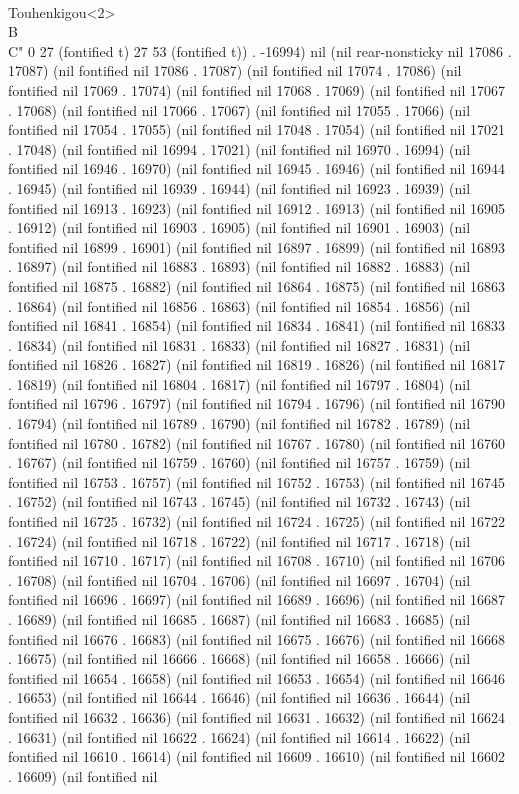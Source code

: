 		     \\Touhenkigou<2>\\B\\C" 0 27 (fontified t) 27 53 (fontified t)) . -16994) nil (nil rear-nonsticky nil 17086 . 17087) (nil fontified nil 17086 . 17087) (nil fontified nil 17074 . 17086) (nil fontified nil 17069 . 17074) (nil fontified nil 17068 . 17069) (nil fontified nil 17067 . 17068) (nil fontified nil 17066 . 17067) (nil fontified nil 17055 . 17066) (nil fontified nil 17054 . 17055) (nil fontified nil 17048 . 17054) (nil fontified nil 17021 . 17048) (nil fontified nil 16994 . 17021) (nil fontified nil 16970 . 16994) (nil fontified nil 16946 . 16970) (nil fontified nil 16945 . 16946) (nil fontified nil 16944 . 16945) (nil fontified nil 16939 . 16944) (nil fontified nil 16923 . 16939) (nil fontified nil 16913 . 16923) (nil fontified nil 16912 . 16913) (nil fontified nil 16905 . 16912) (nil fontified nil 16903 . 16905) (nil fontified nil 16901 . 16903) (nil fontified nil 16899 . 16901) (nil fontified nil 16897 . 16899) (nil fontified nil 16893 . 16897) (nil fontified nil 16883 . 16893) (nil fontified nil 16882 . 16883) (nil fontified nil 16875 . 16882) (nil fontified nil 16864 . 16875) (nil fontified nil 16863 . 16864) (nil fontified nil 16856 . 16863) (nil fontified nil 16854 . 16856) (nil fontified nil 16841 . 16854) (nil fontified nil 16834 . 16841) (nil fontified nil 16833 . 16834) (nil fontified nil 16831 . 16833) (nil fontified nil 16827 . 16831) (nil fontified nil 16826 . 16827) (nil fontified nil 16819 . 16826) (nil fontified nil 16817 . 16819) (nil fontified nil 16804 . 16817) (nil fontified nil 16797 . 16804) (nil fontified nil 16796 . 16797) (nil fontified nil 16794 . 16796) (nil fontified nil 16790 . 16794) (nil fontified nil 16789 . 16790) (nil fontified nil 16782 . 16789) (nil fontified nil 16780 . 16782) (nil fontified nil 16767 . 16780) (nil fontified nil 16760 . 16767) (nil fontified nil 16759 . 16760) (nil fontified nil 16757 . 16759) (nil fontified nil 16753 . 16757) (nil fontified nil 16752 . 16753) (nil fontified nil 16745 . 16752) (nil fontified nil 16743 . 16745) (nil fontified nil 16732 . 16743) (nil fontified nil 16725 . 16732) (nil fontified nil 16724 . 16725) (nil fontified nil 16722 . 16724) (nil fontified nil 16718 . 16722) (nil fontified nil 16717 . 16718) (nil fontified nil 16710 . 16717) (nil fontified nil 16708 . 16710) (nil fontified nil 16706 . 16708) (nil fontified nil 16704 . 16706) (nil fontified nil 16697 . 16704) (nil fontified nil 16696 . 16697) (nil fontified nil 16689 . 16696) (nil fontified nil 16687 . 16689) (nil fontified nil 16685 . 16687) (nil fontified nil 16683 . 16685) (nil fontified nil 16676 . 16683) (nil fontified nil 16675 . 16676) (nil fontified nil 16668 . 16675) (nil fontified nil 16666 . 16668) (nil fontified nil 16658 . 16666) (nil fontified nil 16654 . 16658) (nil fontified nil 16653 . 16654) (nil fontified nil 16646 . 16653) (nil fontified nil 16644 . 16646) (nil fontified nil 16636 . 16644) (nil fontified nil 16632 . 16636) (nil fontified nil 16631 . 16632) (nil fontified nil 16624 . 16631) (nil fontified nil 16622 . 16624) (nil fontified nil 16614 . 16622) (nil fontified nil 16610 . 16614) (nil fontified nil 16609 . 16610) (nil fontified nil 16602 . 16609) (nil fontified nil 